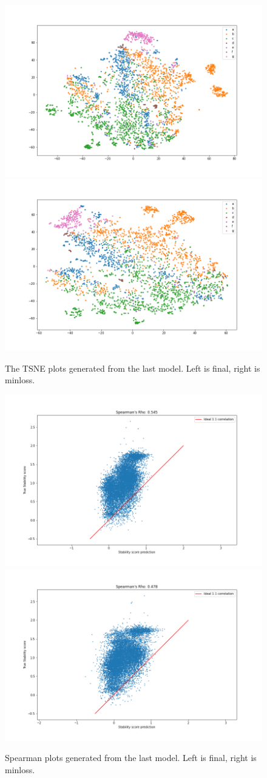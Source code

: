 \begin{figure}[!ht]
  \centering
  \includegraphics[width=0.49\linewidth]{latex/imgs/finished_tsne_final.png}
  \includegraphics[width=0.49\linewidth]{latex/imgs/finished_tsne_minloss.png}
  \caption{The TSNE plots generated from the last model. Left is final, right is minloss.}
  \label{fig:finished_tsne}
\end{figure}

\begin{figure}[!ht]
  \centering
  \includegraphics[width=0.49\linewidth]{latex/imgs/finished_spearman_final.png}
  \includegraphics[width=0.49\linewidth]{latex/imgs/finished_spearman_minloss.png}
  \caption{Spearman plots generated from the last model. Left is final, right is minloss.}
  \label{fig:finished_spearman}
\end{figure}